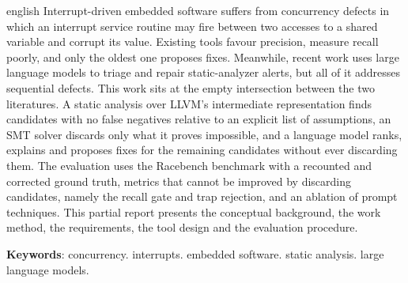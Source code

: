 \begin{resumo}[Abstract]
\begin{otherlanguage*}{english}
Interrupt-driven embedded software suffers from concurrency defects in which an interrupt service routine may fire between two
accesses to a shared variable and corrupt its value. Existing tools favour
precision, measure recall poorly, and only the oldest one proposes fixes.
Meanwhile, recent work uses large language models to triage and repair
static-analyzer alerts, but all of it addresses sequential defects. This work
sits at the empty intersection between the two literatures. A static analysis
over LLVM's intermediate representation finds candidates with no false
negatives relative to an explicit list of assumptions, an SMT solver discards
only what it proves impossible, and a language model ranks, explains and
proposes fixes for the remaining candidates without ever discarding them. The
evaluation uses the Racebench benchmark with a recounted and corrected ground
truth, metrics that cannot be improved by discarding candidates, namely the
recall gate and trap rejection, and an ablation of prompt
techniques. This partial report presents the conceptual background, the work
method, the requirements, the tool design and the evaluation procedure.

\vspace{\onelineskip}

\noindent
\textbf{Keywords}: concurrency. interrupts. embedded software. static analysis.
large language models.
\end{otherlanguage*}
\end{resumo}
